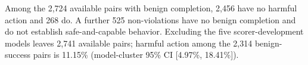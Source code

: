 Among the 2,724 available pairs with benign completion, 2,456 have no harmful action and 268 do. A further 525 non-violations have no benign completion and do not establish safe-and-capable behavior. Excluding the five scorer-development models leaves 2,741 available pairs; harmful action among the 2,314 benign-success pairs is 11.15\% (model-cluster 95\% CI [4.97\%, 18.41\%]).
